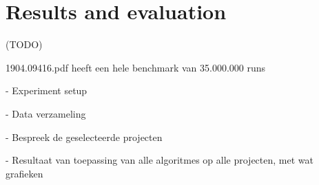 \chapter{Results and evaluation}
(TODO)

1904.09416.pdf heeft een hele benchmark van 35.000.000 runs

- Experiment setup

  -  Data verzameling

  - Bespreek de geselecteerde projecten
  
- Resultaat van toepassing van alle algoritmes op alle projecten, met wat grafieken